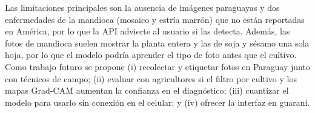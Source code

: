 \documentclass[conference]{IEEEtran}
\begin{document}
Las limitaciones principales son la ausencia de im\'agenes paraguayas y dos enfermedades de la mandioca (mosaico y estr\'ia marr\'on) que no est\'an reportadas en Am\'erica, por lo que la API advierte al usuario si las detecta. Adem\'as, las fotos de mandioca suelen mostrar la planta entera y las de soja y s\'esamo una sola hoja, por lo que el modelo podr\'ia aprender el tipo de foto antes que el cultivo. Como trabajo futuro se propone (i) recolectar y etiquetar fotos en Paraguay junto con t\'ecnicos de campo; (ii) evaluar con agricultores si el filtro por cultivo y los mapas Grad-CAM aumentan la confianza en el diagn\'ostico; (iii) cuantizar el modelo para usarlo sin conexi\'on en el celular; y (iv) ofrecer la interfaz en guaran\'i.



\end{document}
